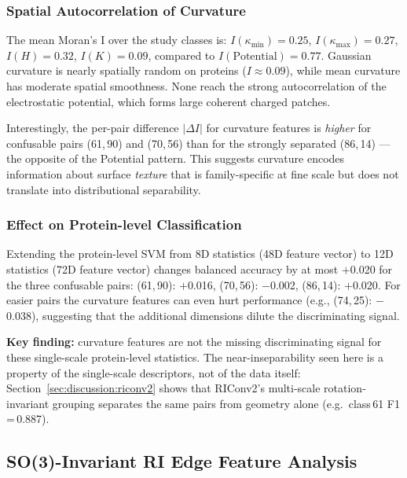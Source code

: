 \subsubsection{Spatial Autocorrelation of Curvature}

The mean Moran's I over the study classes is:
$I(\kappa_\text{min}) = 0.25$,
$I(\kappa_\text{max}) = 0.27$,
$I(H) = 0.32$,
$I(K) = 0.09$,
compared to $I(\text{Potential}) = 0.77$.
Gaussian curvature is nearly spatially random on proteins ($I \approx 0.09$),
while mean curvature has moderate spatial smoothness.
None reach the strong autocorrelation of the electrostatic potential, which
forms large coherent charged patches.

Interestingly, the per-pair difference $|\Delta I|$ for curvature features is
\textit{higher} for confusable pairs (61,\,90) and (70,\,56) than for the
strongly separated (86,\,14) --- the opposite of the Potential pattern.
This suggests curvature encodes information about surface \emph{texture} that
is family-specific at fine scale but does not translate into distributional
separability.

\subsubsection{Effect on Protein-level Classification}

Extending the protein-level SVM from 8D statistics (48D feature vector) to
12D statistics (72D feature vector) changes balanced accuracy by at most
$+$0.020 for the three confusable pairs:
(61,\,90): $+$0.016, (70,\,56): $-$0.002, (86,\,14): $+$0.020.
For easier pairs the curvature features can even hurt performance (e.g.,
(74,\,25): $-$0.038), suggesting that the additional dimensions dilute the
discriminating signal.

\textbf{Key finding:} curvature features are not the missing discriminating
signal for these single-scale protein-level statistics.
The near-inseparability seen here is a property of the single-scale descriptors,
not of the data itself: Section~\ref{sec:discussion:riconv2} shows that RIConv2's
multi-scale rotation-invariant grouping separates the same pairs from geometry
alone (e.g.\ class\,61 F1\,=\,0.887).

\subsection{SO(3)-Invariant RI Edge Feature Analysis}
\label{sec:analysis:ri}

